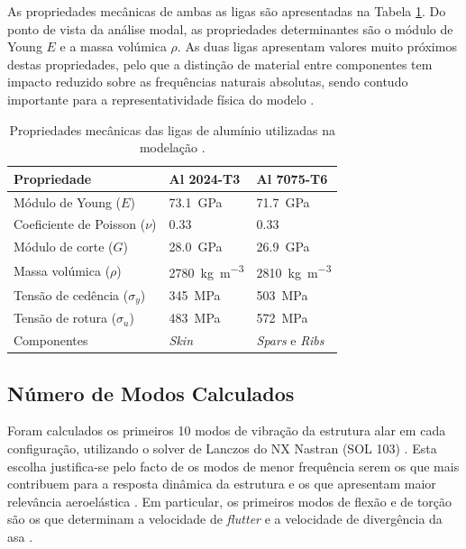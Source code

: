 \documentclass[11pt,oneside,a4paper,final]{report}
\begin{document}
As propriedades mecânicas de ambas as ligas são apresentadas na Tabela \ref{tab:materiais}. Do ponto de vista da análise modal, as propriedades determinantes são o módulo de Young $E$ e a massa volúmica $\rho$. As duas ligas apresentam valores muito próximos destas propriedades, pelo que a distinção de material entre componentes tem impacto reduzido sobre as frequências naturais absolutas, sendo contudo importante para a representatividade física do modelo \cite{Megson2012}.

\begin{table}[H]
\centering
\caption{Propriedades mecânicas das ligas de alumínio 
utilizadas na modelação \cite{ASM2008}.}
\label{tab:materiais}
\renewcommand{\arraystretch}{1.4}
\begin{tabularx}{\textwidth}{p{4.5cm} X X}
\toprule
\textbf{Propriedade} & \textbf{Al 2024-T3} & 
\textbf{Al 7075-T6} \\
\midrule
Módulo de Young ($E$)
    & \SI{73.1}{\giga\pascal}
    & \SI{71.7}{\giga\pascal} \\
Coeficiente de Poisson ($\nu$)
    & $0.33$
    & $0.33$ \\
Módulo de corte ($G$)
    & \SI{28.0}{\giga\pascal}
    & \SI{26.9}{\giga\pascal} \\
Massa volúmica ($\rho$)
    & \SI{2780}{\kilo\gram\per\cubic\meter}
    & \SI{2810}{\kilo\gram\per\cubic\meter} \\
Tensão de cedência ($\sigma_y$)
    & \SI{345}{\mega\pascal}
    & \SI{503}{\mega\pascal} \\
Tensão de rotura ($\sigma_u$)
    & \SI{483}{\mega\pascal}
    & \SI{572}{\mega\pascal} \\
Componentes
    & \textit{Skin}
    & \textit{Spars} e \textit{Ribs} \\
\bottomrule
\end{tabularx}
\end{table}

\subsection{Número de Modos Calculados}

Foram calculados os primeiros 10 modos de vibração da estrutura alar em cada configuração, utilizando o solver de Lanczos do NX Nastran (SOL 103) \cite{Nastran2014}. Esta escolha justifica-se pelo facto de os modos de menor frequência serem os que mais contribuem para a resposta dinâmica da estrutura e os que apresentam maior relevância aeroelástica \cite{Craig2006}. Em particular, os primeiros modos de flexão e de torção são os que determinam a velocidade de \textit{flutter} e a velocidade de divergência da asa \cite{Bisplinghoff1996, Fung1993}.
\end{document}
